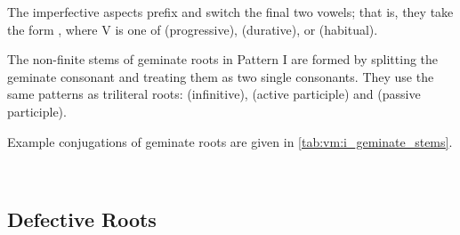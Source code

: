 \documentclass[grammar]{subfiles}
\begin{document}
The imperfective aspects prefix  and switch the final two vowels; that
is, they take the form , where V is one of 
(progressive),  (durative), or  (habitual).


The non-finite stems of geminate roots in Pattern I are formed by splitting the
geminate consonant and treating them as two single consonants.  They use the
same patterns as triliteral roots:   (infinitive), 
(active participle) and  (passive participle). 

Example conjugations of geminate roots are given in
\cref{tab:vm:i_geminate_stems}.


\begin{table}[h!]\small\capstart
  \centering
  \\
  \caption{Pattern I geminate stems \label{tab:vm:i_geminate_stems}}
\end{table}


\subsection{Defective Roots}
\label{ssec:vm:i_defective}
\end{document}
